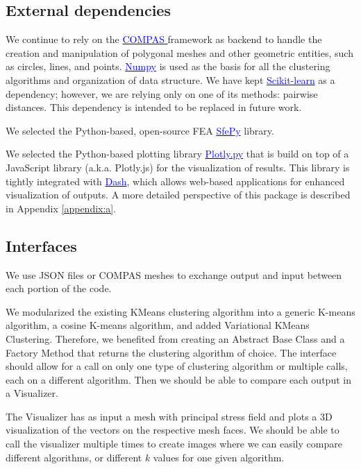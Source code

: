 \documentclass[11pt]{article}
\begin{document}
\subsection{External dependencies}
We continue to rely on the \href{http://www.compas.dev}{\textcolor{blue}{ COMPAS }} framework as backend to handle the creation and manipulation of polygonal meshes and other geometric entities, such as circles, lines, and points. 
\href{http://www.numpy.org}{\textcolor{blue}{Numpy}} is used as the basis for all the clustering algorithms and organization of data structure. 
We have kept \href{https://scikit-learn.org/stable/index.html}{\textcolor{blue}{Scikit-learn}} as a dependency; however, we are relying only on one of its methods: pairwise distances. This dependency is intended to be replaced in future work. 

We selected the Python-based, open-source FEA \href{http://sfepy.org/doc-devel/index.html}{\textcolor{blue}{SfePy}} library.

We selected the Python-based plotting library \href{https://plotly.com/python/}{\textcolor{blue}{Plotly.py}} that is build on top of a JavaScript library (a.k.a. Plotly.js) for the visualization of results. This library is tightly integrated with
\href{https://plotly.com/dash/?utm_source=dash_demo&utm_medium=graphing_banner&utm_campaign=python}{\textcolor{blue}{Dash}}, which allows web-based applications for enhanced visualization of outputs. A more detailed perspective of this package is described in Appendix \ref{appendix:a}.

\subsection{Interfaces}

We use JSON files or COMPAS meshes to exchange output and input between each portion of the code.

We modularized the existing KMeans clustering algorithm into a generic K-means algorithm, a cosine K-means algorithm, and added Variational KMeans Clustering. Therefore, we benefited from creating an Abstract Base Class and a Factory Method that returns the clustering algorithm of choice.
The interface should allow for a call on only one type of clustering algorithm or multiple calls, each on a different algorithm. Then we should be able to compare each output in a Visualizer.


The Visualizer has as input a mesh with principal stress field and plots a 3D visualization of the vectors on the respective mesh faces. We should be able to call the visualizer multiple times to create images where we can easily compare different algorithms, or different $k$ values for one given algorithm.  
\end{document}
